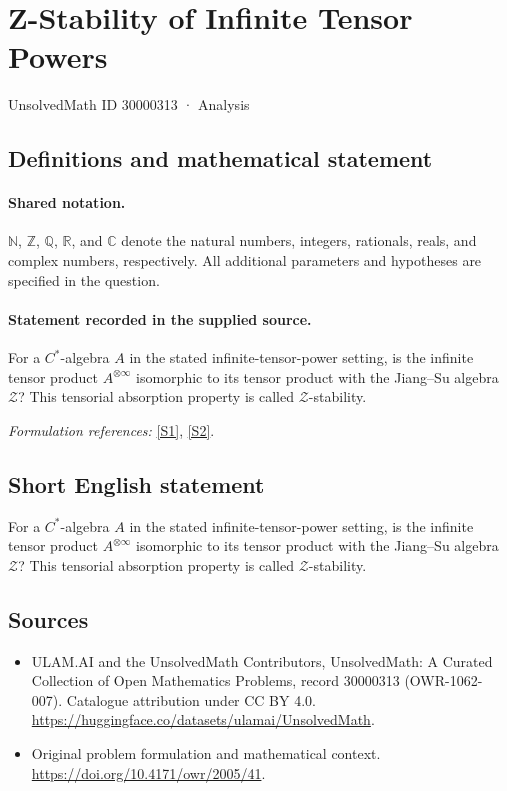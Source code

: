 \documentclass[11pt]{article}
\newcommand{\sref}[2]{\hyperlink{source:#1:#2}{[S#2]}}
\begin{document}
\setcounter{section}{30000312}
\section{Z-Stability of Infinite Tensor Powers}\label{30000313}
{\small UnsolvedMath ID 30000313 · Analysis}
\subsection{Definitions and mathematical statement}

\paragraph{Shared notation.}$\mathbb N$, $\mathbb Z$, $\mathbb Q$, $\mathbb R$, and $\mathbb C$ denote the natural numbers, integers, rationals, reals, and complex numbers, respectively. All additional parameters and hypotheses are specified in the question.


\paragraph{Statement recorded in the supplied source.}
For a $C^*$-algebra $A$ in the stated infinite-tensor-power setting, is the infinite tensor product $A^{\otimes\infty}$ isomorphic to its tensor product with the Jiang--Su algebra $\mathcal Z$? This tensorial absorption property is called $\mathcal Z$-stability.
\par\smallskip\textit{Formulation references:} \sref{30000313}{1}, \sref{30000313}{2}.
\subsection{Short English statement}
For a $C^*$-algebra $A$ in the stated infinite-tensor-power setting, is the infinite tensor product $A^{\otimes\infty}$ isomorphic to its tensor product with the Jiang--Su algebra $\mathcal Z$? This tensorial absorption property is called $\mathcal Z$-stability.
\subsection{Sources}
\begin{itemize}
\item[\hypertarget{source:30000313:1}{S1}] ULAM.AI and the UnsolvedMath Contributors, UnsolvedMath: A Curated Collection of Open Mathematics Problems, record 30000313 (OWR-1062-007). Catalogue attribution under CC BY 4.0.
\url{https://huggingface.co/datasets/ulamai/UnsolvedMath}.
\item[\hypertarget{source:30000313:2}{S2}] Original problem formulation and mathematical context.
\url{https://doi.org/10.4171/owr/2005/41}.
\end{itemize}
\label{end:30000313}
\end{document}
